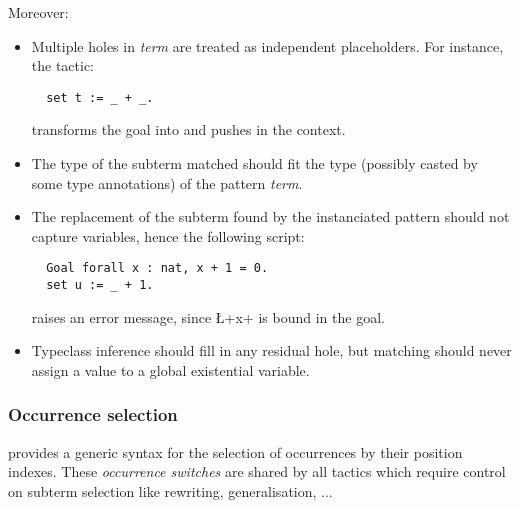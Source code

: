 Moreover:
\begin{itemize}
\item Multiple holes in \textit{term} are treated as independent
  placeholders. For instance, the tactic:
\begin{lstlisting}
  set t := _ + _.
\end{lstlisting}
transforms the goal  into  and pushes 
 in the context.
\item The type of the subterm matched should fit the type
  (possibly casted by some type annotations) of the pattern
  \textit{term}.
\item The replacement of the subterm found by the instanciated pattern
  should not capture variables, hence the following script:
\begin{lstlisting}
  Goal forall x : nat, x + 1 = 0.
  set u := _ + 1.
\end{lstlisting}
raises an error message, since \L+x+ is bound in the goal.
\item Typeclass inference should fill in any residual hole, but
matching should never assign a value to a global existential variable.

\end{itemize}


\subsubsection*{Occurrence selection}\label{sssec:occselect}

\ssr{} provides a generic syntax for the selection of occurrences by
their position indexes. These \emph{occurrence switches} are shared by
all
\ssr{} tactics which require control on subterm selection like rewriting,
generalisation, ... 


